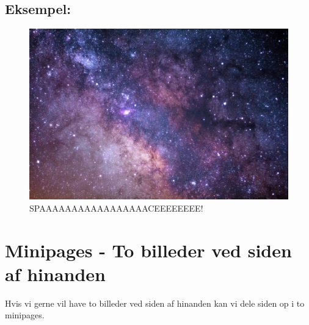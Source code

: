 \subsection{Eksempel:}
\lipsum[4]    %
\begin{figure} %
    \centering
    \includegraphics[width=0.95\linewidth]{media/AAUgraphics/frontpageImage.jpg} 
    \caption{SPAAAAAAAAAAAAAAAAACEEEEEEEE!}
    \label{fig:wraptable}
\end{figure}
\vspace{-0cm} %
\lipsum[4-5]    %

\pagebreak

\section{Minipages - To billeder ved siden af hinanden}
Hvis vi gerne vil have to billeder ved siden af hinanden kan vi dele siden op i to minipages.


